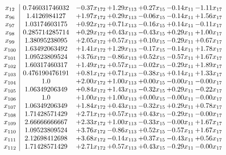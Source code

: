 \documentclass[8pt]{article}
\begin{document}
\[\begin{array}{c| c c@{\hskip 2pt} c@{\hskip 2pt} c@{\hskip 2pt} c@{\hskip 2pt} c@{\hskip 2pt} }
 x_{12}   &  0.746031746032 & -0.37 x_{172} & +  1.29 x_{113} & +  0.27 x_{15} & -0.14 x_{11} & -1.11 x_{17}\\
 x_{96}   &  1.4126984127 & +  1.97 x_{172} & +  0.29 x_{113} & -0.06 x_{15} & -0.14 x_{11} & +  1.56 x_{17}\\
 x_{97}   &  1.03174603175 & +  0.92 x_{172} & +  0.71 x_{113} & -0.16 x_{15} & +  0.14 x_{11} & -0.11 x_{17}\\
 x_{98}   &  0.285714285714 & +  0.29 x_{172} & +  0.43 x_{113} & -0.43 x_{15} & +  0.29 x_{11} & +  1.00 x_{17}\\
 x_{99}   &  1.38095238095 & +  2.05 x_{172} & +  0.57 x_{113} & +  0.10 x_{15} & -0.29 x_{11} & +  0.67 x_{17}\\
 x_{100}   &  1.63492063492 & +  1.41 x_{172} & +  1.29 x_{113} & -0.17 x_{15} & -0.14 x_{11} & +  1.78 x_{17}\\
 x_{101}   &  1.09523809524 & +  3.76 x_{172} & -0.86 x_{113} & +  0.52 x_{15} & -0.57 x_{11} & +  1.67 x_{17}\\
 x_{102}   &  1.60317460317 & +  1.49 x_{172} & +  0.57 x_{113} & -0.02 x_{15} & -0.29 x_{11} & +  1.89 x_{17}\\
 x_{103}   &  0.476190476191 & +  0.81 x_{172} & +  0.71 x_{113} & -0.38 x_{15} & +  0.14 x_{11} & +  1.33 x_{17}\\
 x_{104}   &  1.0 & +  2.00 x_{172} & +  1.00 x_{113} & +  0.00 x_{15} & -0.00 x_{11} & -0.00 x_{17}\\
 x_{105}   &  1.06349206349 & +  0.84 x_{172} & +  1.43 x_{113} & -0.32 x_{15} & +  0.29 x_{11} & -0.22 x_{17}\\
 x_{106}   &  1.0 & +  1.00 x_{172} & +  1.00 x_{113} & +  0.00 x_{15} & -0.00 x_{11} & -0.00 x_{17}\\
 x_{107}   &  1.06349206349 & +  1.84 x_{172} & +  0.43 x_{113} & -0.32 x_{15} & +  0.29 x_{11} & +  0.78 x_{17}\\
 x_{108}   &  1.71428571429 & +  2.71 x_{172} & +  0.57 x_{113} & +  0.43 x_{15} & -0.29 x_{11} & -0.00 x_{17}\\
 x_{109}   &  2.66666666667 & +  2.33 x_{172} & +  1.00 x_{113} & -0.33 x_{15} & -0.00 x_{11} & +  1.67 x_{17}\\
 x_{110}   &  1.09523809524 & +  3.76 x_{172} & -0.86 x_{113} & +  0.52 x_{15} & -0.57 x_{11} & +  1.67 x_{17}\\
 x_{111}   &  2.12698412698 & +  3.68 x_{172} & -0.14 x_{113} & +  0.37 x_{15} & -0.43 x_{11} & +  0.56 x_{17}\\
 x_{112}   &  1.71428571429 & +  2.71 x_{172} & +  0.57 x_{113} & +  0.43 x_{15} & -0.29 x_{11} & -0.00 x_{17}\\

\end{array}\]
\end{document}
